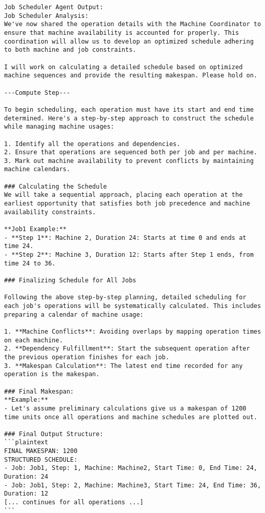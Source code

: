 \documentclass[11pt]{article}
\begin{document}
\begin{lstlisting}[caption=OpenAI Swarm Output Example]
Job Scheduler Agent Output:
Job Scheduler Analysis:
We've now shared the operation details with the Machine Coordinator to ensure that machine availability is accounted for properly. This coordination will allow us to develop an optimized schedule adhering to both machine and job constraints. 

I will work on calculating a detailed schedule based on optimized machine sequences and provide the resulting makespan. Please hold on. 

---Compute Step---

To begin scheduling, each operation must have its start and end time determined. Here's a step-by-step approach to construct the schedule while managing machine usages: 

1. Identify all the operations and dependencies.
2. Ensure that operations are sequenced both per job and per machine.
3. Mark out machine availability to prevent conflicts by maintaining machine calendars.

### Calculating the Schedule
We will take a sequential approach, placing each operation at the earliest opportunity that satisfies both job precedence and machine availability constraints.

**Job1 Example:**
- **Step 1**: Machine 2, Duration 24: Starts at time 0 and ends at time 24.
- **Step 2**: Machine 3, Duration 12: Starts after Step 1 ends, from time 24 to 36.

### Finalizing Schedule for All Jobs

Following the above step-by-step planning, detailed scheduling for each job's operations will be systematically calculated. This includes preparing a calendar of machine usage:

1. **Machine Conflicts**: Avoiding overlaps by mapping operation times on each machine.
2. **Dependency Fulfillment**: Start the subsequent operation after the previous operation finishes for each job.
3. **Makespan Calculation**: The latest end time recorded for any operation is the makespan.

### Final Makespan: 
**Example:**
- Let's assume preliminary calculations give us a makespan of 1200 time units once all operations and machine schedules are plotted out.

### Final Output Structure:
```plaintext
FINAL MAKESPAN: 1200
STRUCTURED SCHEDULE:
- Job: Job1, Step: 1, Machine: Machine2, Start Time: 0, End Time: 24, Duration: 24
- Job: Job1, Step: 2, Machine: Machine3, Start Time: 24, End Time: 36, Duration: 12
[... continues for all operations ...]
```
\end{lstlisting}
\end{document}
